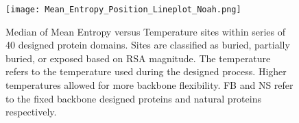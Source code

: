 \documentclass[12pt]{article}
\begin{document}
\begin{figure}[H]
\centerline{\texttt{[image: Mean\_Entropy\_Position\_Lineplot\_Noah.png]}}
\caption{Median of Mean Entropy versus Temperature sites within series of 40 designed protein domains.  Sites are classified as buried, partially buried, or exposed based on RSA magnitude. The temperature refers to the temperature used during the designed process. Higher temperatures allowed for more backbone flexibility. FB and NS refer to the fixed backbone designed proteins and natural proteins respectively.}
\label{Postion_Entropy_Noah}
\end{figure}
\end{document}
